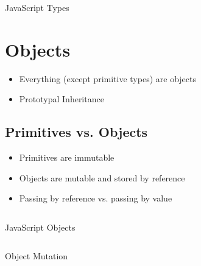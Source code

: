 \begin{code}
	\inputminted{js}{src0/1-types.js}
	\caption{JavaScript Types}
\end{code}

\section{Objects}
\begin{itemize}
	\item Everything (except primitive types) are objects
	\item Prototypal Inheritance
\end{itemize}

\subsection{Primitives vs. Objects}
\begin{itemize}
	\item Primitives are immutable
	\item Objects are mutable and stored by reference
	\item Passing by reference vs. passing by value
\end{itemize}

\begin{code}
	\inputminted{js}{src0/2-objects.js}
	\caption{JavaScript Objects}
\end{code}

\clearpage
\begin{code}
	\inputminted{js}{src0/3-objectMutation.js}
	\caption{Object Mutation}
\end{code}

